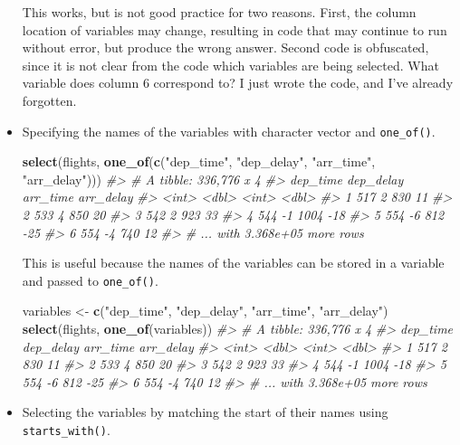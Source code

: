 \documentclass[]{book}
\newenvironment{Shaded}{\begin{snugshade}}{\end{snugshade}}
\newcommand{\CommentTok}[1]{\textcolor[rgb]{0.56,0.35,0.01}{\textit{#1}}}
\newcommand{\KeywordTok}[1]{\textcolor[rgb]{0.13,0.29,0.53}{\textbf{#1}}}
\newcommand{\NormalTok}[1]{#1}
\newcommand{\StringTok}[1]{\textcolor[rgb]{0.31,0.60,0.02}{#1}}
\theoremstyle{plain}
\theoremstyle{remark}
\begin{document}
\begin{itemize}
  This works, but is not good practice for two reasons.
  First, the column location of variables may change, resulting in code that
  may continue to run without error, but produce the wrong answer.
  Second code is obfuscated, since it is not clear from the code which
  variables are being selected. What variable does column 6 correspond to?
  I just wrote the code, and I've already forgotten.
\item
  Specifying the names of the variables with character vector and \texttt{one\_of()}.

\begin{Shaded}
\begin{Highlighting}[]
\KeywordTok{select}\NormalTok{(flights, }\KeywordTok{one_of}\NormalTok{(}\KeywordTok{c}\NormalTok{(}\StringTok{"dep_time"}\NormalTok{, }\StringTok{"dep_delay"}\NormalTok{, }\StringTok{"arr_time"}\NormalTok{, }\StringTok{"arr_delay"}\NormalTok{)))}
\CommentTok{#> # A tibble: 336,776 x 4}
\CommentTok{#>   dep_time dep_delay arr_time arr_delay}
\CommentTok{#>      <int>     <dbl>    <int>     <dbl>}
\CommentTok{#> 1      517         2      830        11}
\CommentTok{#> 2      533         4      850        20}
\CommentTok{#> 3      542         2      923        33}
\CommentTok{#> 4      544        -1     1004       -18}
\CommentTok{#> 5      554        -6      812       -25}
\CommentTok{#> 6      554        -4      740        12}
\CommentTok{#> # ... with 3.368e+05 more rows}
\end{Highlighting}
\end{Shaded}

  This is useful because the names of the variables can be stored in a
  variable and passed to \texttt{one\_of()}.

\begin{Shaded}
\begin{Highlighting}[]
\NormalTok{variables <-}\StringTok{ }\KeywordTok{c}\NormalTok{(}\StringTok{"dep_time"}\NormalTok{, }\StringTok{"dep_delay"}\NormalTok{, }\StringTok{"arr_time"}\NormalTok{, }\StringTok{"arr_delay"}\NormalTok{)}
\KeywordTok{select}\NormalTok{(flights, }\KeywordTok{one_of}\NormalTok{(variables))}
\CommentTok{#> # A tibble: 336,776 x 4}
\CommentTok{#>   dep_time dep_delay arr_time arr_delay}
\CommentTok{#>      <int>     <dbl>    <int>     <dbl>}
\CommentTok{#> 1      517         2      830        11}
\CommentTok{#> 2      533         4      850        20}
\CommentTok{#> 3      542         2      923        33}
\CommentTok{#> 4      544        -1     1004       -18}
\CommentTok{#> 5      554        -6      812       -25}
\CommentTok{#> 6      554        -4      740        12}
\CommentTok{#> # ... with 3.368e+05 more rows}
\end{Highlighting}
\end{Shaded}
\item
  Selecting the variables by matching the start of their names using
  \texttt{starts\_with()}.


\end{itemize}
\end{document}

